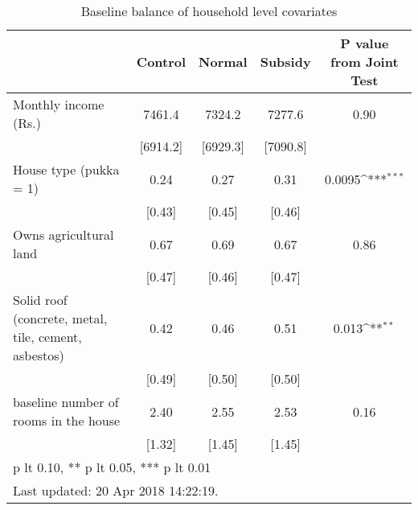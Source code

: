 \begin{table}[htbp]\centering
\def\sym#1{\ifmmode^{#1}\else\(^{#1}\)\fi}
\caption{Baseline balance of household level covariates \label{tab:"balance"}}
\begin{tabular*}{1\hsize}{@{\hskip\tabcolsep\extracolsep\fill}l*{1}{cccc}}
\toprule
                                &  Control&   Normal&  Subsidy&P value from Joint Test         \\
\midrule
Monthly income (Rs.)            &   7461.4&   7324.2&   7277.6&     0.90         \\
                                & [6914.2]& [6929.3]& [7090.8]&                  \\
House type (pukka = 1)          &     0.24&     0.27&     0.31&   0.0095\sym{***}\\
                                &   [0.43]&   [0.45]&   [0.46]&                  \\
Owns agricultural land          &     0.67&     0.69&     0.67&     0.86         \\
                                &   [0.47]&   [0.46]&   [0.47]&                  \\
Solid roof (concrete, metal, tile, cement, asbestos)&     0.42&     0.46&     0.51&    0.013\sym{**} \\
                                &   [0.49]&   [0.50]&   [0.50]&                  \\
baseline number of rooms in the house&     2.40&     2.55&     2.53&     0.16         \\
                                &   [1.32]&   [1.45]&   [1.45]&                  \\
\bottomrule
\multicolumn{5}{l}{\footnotesize * p lt 0.10, ** p lt 0.05, *** p lt 0.01}\\
\multicolumn{5}{l}{\footnotesize Last updated: 20 Apr 2018 14:22:19.}\\
\end{tabular*}
\end{table}
